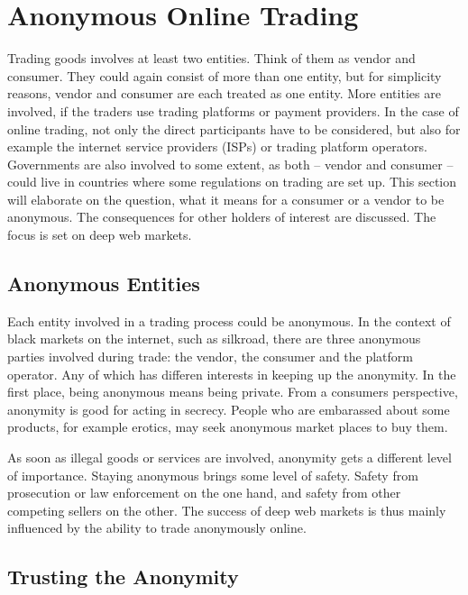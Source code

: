 \section{Anonymous Online Trading}
\label{trading}

Trading goods involves at least two entities. Think of them as vendor and consumer. They could again consist of more than one entity, but for simplicity reasons, vendor and consumer are each treated as one entity. More entities are involved, if the traders use trading platforms or payment providers. In the case of online trading, not only the direct participants have to be considered, but also for example the internet service providers (ISPs) or trading platform operators. Governments are also involved to some extent, as both -- vendor and consumer -- could live in countries where some regulations on trading are set up.
This section will elaborate on the question, what it means for a consumer or a vendor to be anonymous. The consequences for other holders of interest are discussed. The focus is set on deep web markets.

\subsection{Anonymous Entities}

Each entity involved in a trading process could be anonymous. In the context of black markets on the internet, such as silkroad\cite{silkroad2013}, there are three anonymous parties involved during trade: the vendor, the consumer and the platform operator. Any of which has differen interests in keeping up the anonymity. In the first place, being anonymous means being private. From a consumers perspective, anonymity is good for acting in secrecy. People who are embarassed about some products, for example erotics, may seek anonymous market places to buy them.

As soon as illegal goods or services are involved, anonymity gets a different level of importance. Staying anonymous brings some level of safety. Safety from prosecution or law enforcement on the one hand, and safety from other competing sellers on the other. The success of deep web markets is thus mainly influenced by the ability to trade anonymously online.


\subsection{Trusting the Anonymity}

